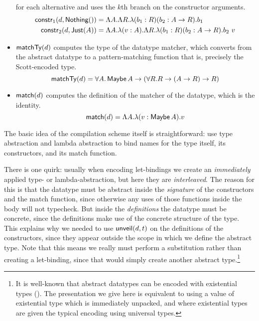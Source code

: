 \begin{itemize}
  for each alternative and uses the $k$th branch on the constructor arguments.
  \begin{align*}
  \constr{d}{\Nothing ()}{1} &= \Lambda A . \Lambda R . \lambda (b_1 : R) (b_2 : A -> R) . b_1\\
  \constr{d}{\Just (A)}{2} &= \Lambda A . \lambda (v : A) . \Lambda R . \lambda (b_1 : R) (b_2 : A -> R) . b_2\ v
  \end{align*}
\item $\matchTy{d}$ computes the type of the datatype matcher, which converts
  from the abstract datatype to a pattern-matching function \textemdash{} that
  is, precisely the Scott-encoded type.
  $$\matchTy{d} = \forall A . \Maybe A \rightarrow (\forall R . R \rightarrow (A \rightarrow R) \rightarrow R)$$
\item $\match{d}$ computes the definition of the matcher of the datatype, which is 
  the identity.
  $$\match{d} = \Lambda A . \lambda (v : \Maybe A) . v$$
\end{itemize}

\noindent The basic idea of the compilation scheme itself is straightforward:
use type abstraction and lambda abstraction to bind names for the
type itself, its constructors, and its match function.

There is one quirk: usually when encoding let-bindings we create an
\emph{immediately} applied type- or lambda-abstraction, but here they are
\emph{interleaved}. The reason for this is that the datatype must be
abstract inside the \emph{signature} of the constructors and the match
function, since otherwise any uses of those functions inside the body will not
typecheck. But inside the \emph{definitions} the datatype must be concrete, since
the definitions make use of the concrete structure of the type.
This explains why we needed to use $\unveil{d}{t}$ on the definitions of the
constructors, since they appear outside the scope in which we define the
abstract type. Note that this means we really must perform a
substitution rather than creating a let-binding, since that would simply create
another abstract type.\footnote{It is
well-known that abstract datatypes can be encoded with existential types (\cite{mitchell1988abstract}). The
presentation we give here is equivalent to using a value of existential type which is immediately
unpacked, and where existential types are given the typical encoding using
universal types.} 

